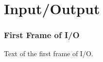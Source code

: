 \section{Input/Output}

\begin{frame}
    \frametitle{First Frame of I/O}
    
    Text of the first frame of I/O.

\end{frame}
